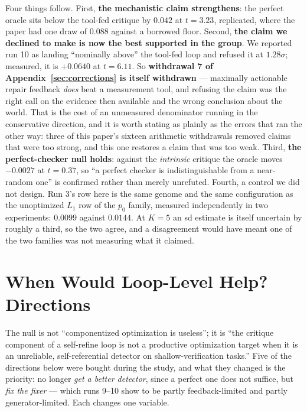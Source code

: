 \documentclass[11pt]{article}
\begin{document}
Four things follow. First, \textbf{the mechanistic claim strengthens}: the perfect oracle sits
below the tool-fed critique by $0.042$ at $t = 3.23$, replicated, where the paper had one draw of
$0.088$ against a borrowed floor. Second, \textbf{the claim we declined to make is now the best
supported in the group}. We reported run 10 as landing ``nominally above'' the tool-fed loop and
refused it at $1.28\sigma$; measured, it is $+0.0640$ at $t = 6.11$. So
\textbf{withdrawal 7 of Appendix~\ref{sec:corrections} is itself withdrawn} --- maximally
actionable repair feedback \emph{does} beat a measurement tool, and refusing the claim was the
right call on the evidence then available and the wrong conclusion about the world. That is the
cost of an unmeasured denominator running in the conservative direction, and it is worth stating
as plainly as the errors that ran the other way: three of this paper's sixteen arithmetic
withdrawals removed claims that were too strong, and this one restores a claim that was too weak.
Third, \textbf{the perfect-checker null holds}: against the \emph{intrinsic} critique the oracle
moves $-0.0027$ at $t = 0.37$, so ``a perfect checker is indistinguishable from a near-random
one'' is confirmed rather than merely unrefuted. Fourth, a control we did not design. Run 3's row
here is the same genome and the same configuration as the unoptimized $L_1$ row of the $p_0$
family, measured independently in two experiments: $0.0099$ against $0.0144$. At $K=5$ an sd
estimate is itself uncertain by roughly a third, so the two agree, and a disagreement would have
meant one of the two families was not measuring what it claimed.


\section{When Would Loop-Level Help? Directions}
\label{sec:directions}

The null is not ``componentized optimization is useless''; it is ``the critique component of a
self-refine loop is not a productive optimization target when it is an unreliable,
self-referential detector on shallow-verification tasks.'' Five of the directions below were
bought during the study, and what they changed is the priority: no longer \emph{get a better
detector}, since a perfect one does not suffice, but \emph{fix the fixer} --- which runs 9--10
show to be partly feedback-limited and partly generator-limited. Each changes one variable.
\end{document}
